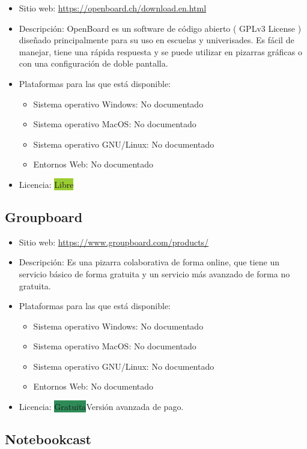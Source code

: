\documentclass[11pt]{article}
\newcommand{\nodoc}{No documentado}
\newcommand{\libre}{\colorbox{YellowGreen}{Libre}}
\newcommand{\gratis}{\colorbox{SeaGreen}{Gratuita}}
\begin{document}
\begin{itemize}
\item Sitio web: \url{https://openboard.ch/download.en.html}
\item Descripción: OpenBoard es un software de código abierto ( GPLv3 License ) diseñado principalmente para su uso en escuelas y univerisades. Es fácil de manejar, tiene una rápida respuesta y se puede utilizar en pizarras gráficas o con una configuración de doble pantalla.

\item Plataformas para las que está disponible:
  \begin{itemize}
  \item Sistema operativo Windows: \nodoc
  \item Sistema operativo MacOS: \nodoc
  \item Sistema operativo GNU/Linux: \nodoc
  \item Entornos Web: \nodoc
  \end{itemize}
\item Licencia: \libre
\end{itemize}


\subsection{Groupboard}

\begin{itemize}
\item Sitio web: \url{https://www.groupboard.com/products/}
\item Descripción: Es una pizarra colaborativa de forma online, que tiene un servicio básico de forma gratuita y un servicio más avanzado de forma no gratuita.
\item Plataformas para las que está disponible:
  \begin{itemize}
  \item Sistema operativo Windows: \nodoc
  \item Sistema operativo MacOS: \nodoc
  \item Sistema operativo GNU/Linux: \nodoc
  \item Entornos Web: \nodoc
  \end{itemize}
\item Licencia: \gratis Versión avanzada de pago.
\end{itemize}

\subsection{Notebookcast}
\end{document}
